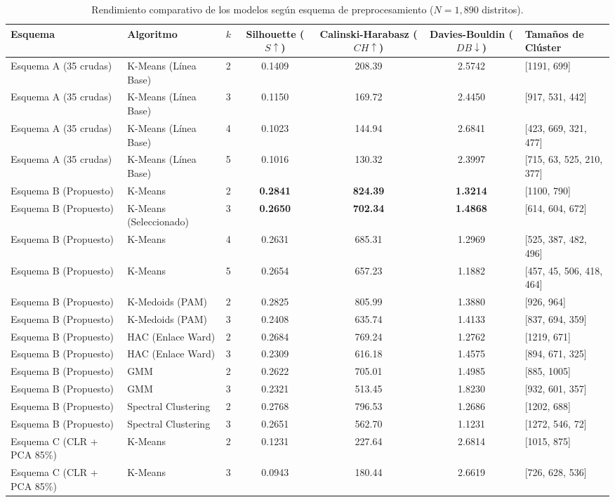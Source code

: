 \documentclass[conference,10pt,letterpaper]{IEEEtran}
\begin{document}
\begin{table}[t]
\centering
\caption{Rendimiento comparativo de los modelos según esquema de preprocesamiento ($N = 1{,}890$ distritos).}
\label{tab:modelos}
\scriptsize
\setlength{\tabcolsep}{3.2pt}
\begin{tabular*}{\textwidth}{@{\extracolsep{\fill}} l l c c c c l @{}}
\toprule
\textbf{Esquema} & \textbf{Algoritmo} & \textbf{$k$} & \textbf{Silhouette ($S \uparrow$)} & \textbf{Calinski-Harabasz ($CH \uparrow$)} & \textbf{Davies-Bouldin ($DB \downarrow$)} & \textbf{Tamaños de Clúster} \\
\midrule
Esquema A (35 crudas) & K-Means (Línea Base) & 2 & 0.1409 & 208.39 & 2.5742 & [1191, 699] \\
Esquema A (35 crudas) & K-Means (Línea Base) & 3 & 0.1150 & 169.72 & 2.4450 & [917, 531, 442] \\
Esquema A (35 crudas) & K-Means (Línea Base) & 4 & 0.1023 & 144.94 & 2.6841 & [423, 669, 321, 477] \\
Esquema A (35 crudas) & K-Means (Línea Base) & 5 & 0.1016 & 130.32 & 2.3997 & [715, 63, 525, 210, 377] \\
\midrule
Esquema B (Propuesto) & K-Means & 2 & \textbf{0.2841} & \textbf{824.39} & \textbf{1.3214} & [1100, 790] \\
Esquema B (Propuesto) & K-Means (Seleccionado) & 3 & \textbf{0.2650} & \textbf{702.34} & \textbf{1.4868} & [614, 604, 672] \\
Esquema B (Propuesto) & K-Means & 4 & 0.2631 & 685.31 & 1.2969 & [525, 387, 482, 496] \\
Esquema B (Propuesto) & K-Means & 5 & 0.2654 & 657.23 & 1.1882 & [457, 45, 506, 418, 464] \\
Esquema B (Propuesto) & K-Medoids (PAM) & 2 & 0.2825 & 805.99 & 1.3880 & [926, 964] \\
Esquema B (Propuesto) & K-Medoids (PAM) & 3 & 0.2408 & 635.74 & 1.4133 & [837, 694, 359] \\
Esquema B (Propuesto) & HAC (Enlace Ward) & 2 & 0.2684 & 769.24 & 1.2762 & [1219, 671] \\
Esquema B (Propuesto) & HAC (Enlace Ward) & 3 & 0.2309 & 616.18 & 1.4575 & [894, 671, 325] \\
Esquema B (Propuesto) & GMM & 2 & 0.2622 & 705.01 & 1.4985 & [885, 1005] \\
Esquema B (Propuesto) & GMM & 3 & 0.2321 & 513.45 & 1.8230 & [932, 601, 357] \\
Esquema B (Propuesto) & Spectral Clustering & 2 & 0.2768 & 796.53 & 1.2686 & [1202, 688] \\
Esquema B (Propuesto) & Spectral Clustering & 3 & 0.2651 & 562.70 & 1.1231 & [1272, 546, 72] \\
\midrule
Esquema C (CLR + PCA 85\%) & K-Means & 2 & 0.1231 & 227.64 & 2.6814 & [1015, 875] \\
Esquema C (CLR + PCA 85\%) & K-Means & 3 & 0.0943 & 180.44 & 2.6619 & [726, 628, 536] \\
\bottomrule
\end{tabular*}
\end{table}
\end{document}
